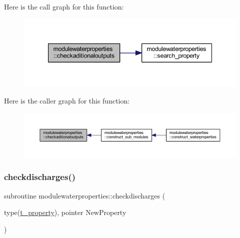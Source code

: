 Here is the call graph for this function\+:\nopagebreak
\begin{figure}[H]
\begin{center}
\leavevmode
\includegraphics[width=347pt]{namespacemodulewaterproperties_aa08d6c50fcab3e8816fe7775bd101952_cgraph}
\end{center}
\end{figure}
Here is the caller graph for this function\+:\nopagebreak
\begin{figure}[H]
\begin{center}
\leavevmode
\includegraphics[width=350pt]{namespacemodulewaterproperties_aa08d6c50fcab3e8816fe7775bd101952_icgraph}
\end{center}
\end{figure}
\mbox{\label{namespacemodulewaterproperties_a3d45e3e4c8782ebce340659d7f000fbb}} 
\subsubsection{\texorpdfstring{checkdischarges()}{checkdischarges()}}
{\footnotesize\ttfamily subroutine modulewaterproperties\+::checkdischarges (\begin{DoxyParamCaption}\item[{type(\mbox{\hyperlink{structmodulewaterproperties_1_1t__property}{t\+\_\+property}}), pointer}]{New\+Property }\end{DoxyParamCaption})\hspace{0.3cm}{\ttfamily [private]}}

